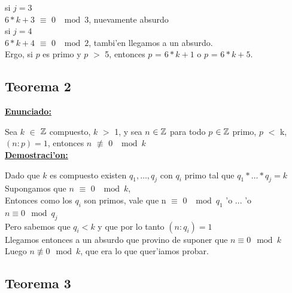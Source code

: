 si $j = 3$\\

$6*k + 3$ $\equiv$ 0  $\mod{3}$, nuevamente absurdo\\

si $j = 4$\\

$6*k + 4$ $\equiv$ 0  $\mod{2}$, tambi'en llegamos a un absurdo.\\

Ergo, si $p$ es primo y $p$ $>$ 5, entonces $p$ = $6*k+1$ o $p$ = $6*k +5$.

\subsection{Teorema 2}
\label{demo2}

\textbf{\underline{Enunciado:}\\}

Sea $k$ $\in$ ${\mathbb Z}$ compuesto, $k$ $>$ 1, y sea $n$ ${\in {\mathbb Z}}$ para todo $p$ ${\in {\mathbb Z}}$ primo, $p$ $<$ k, $(n:p) = 1$, entonces $n$ $\not\equiv$ 0 $\mod{k}$\\

\textbf{\underline{Demostraci'on:}\\}

Dado que $k$ es compuesto existen $q_1,\ldots,q_j$ con $q_i$ primo tal que $q_1*\ldots*q_j = k$ \\

Supongamos que $n$ $\equiv$ 0 $\mod{k}$,\\

Entonces como los $q_i$ son primos, vale que n $\equiv$ 0 $\mod{q_1}$ 'o ... 'o $n \equiv 0 \mod{q_j}$ \\

Pero sabemos que $q_i < k$ y que por lo tanto $(n:q_{i}) = 1$ \\

Llegamos entonces a un absurdo que provino de suponer que  $n \equiv 0 \mod{k}$ \\ 

Luego $n \not\equiv 0 \mod{k}$, que era lo que quer'iamos probar.


\subsection{Teorema 3}
\label{demo3}

